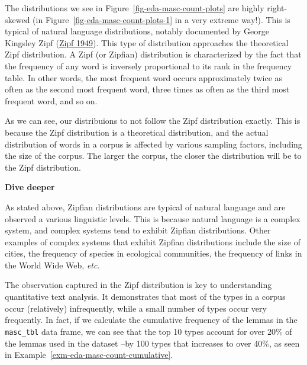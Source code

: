 \documentclass[
  letterpaper,
  DIV=11,
  numbers=noendperiod]{scrreport}
\theoremstyle{definition}
\theoremstyle{remark}
\begin{document}
The distributions we see in Figure~\ref{fig-eda-masc-count-plots} are
highly right-skewed (in Figure~\ref{fig-eda-masc-count-plots-1} in a
very extreme way!). This is typical of natural language distributions,
notably documented by George Kingsley Zipf
(\protect\hyperlink{ref-Zipf1949}{Zipf 1949}). This type of distribution
approaches the theoretical Zipf distribution. A Zipf (or Zipfian)
distribution is characterized by the fact that the frequency of any word
is inversely proportional to its rank in the frequency table. In other
words, the most frequent word occurs approximately twice as often as the
second most frequent word, three times as often as the third most
frequent word, and so on.

As we can see, our distribuions to not follow the Zipf distribution
exactly. This is because the Zipf distribution is a theoretical
distribution, and the actual distribution of words in a corpus is
affected by various sampling factors, including the size of the corpus.
The larger the corpus, the closer the distribution will be to the Zipf
distribution.

\begin{tcolorbox}[enhanced jigsaw, breakable, colback=white, rightrule=.15mm, arc=.35mm, left=2mm, toprule=.15mm, leftrule=.75mm, bottomrule=.15mm, opacityback=0]

\textbf{ Dive deeper}

As stated above, Zipfian distributions are typical of natural language
and are observed a various linguistic levels. This is because natural
language is a complex system, and complex systems tend to exhibit
Zipfian distributions. Other examples of complex systems that exhibit
Zipfian distributions include the size of cities, the frequency of
species in ecological communities, the frequency of links in the World
Wide Web, \emph{etc.}

\end{tcolorbox}

The observation captured in the Zipf distribution is key to
understanding quantitative text analysis. It demonstrates that most of
the types in a corpus occur (relatively) infrequently, while a small
number of types occur very frequently. In fact, if we calculate the
cumulative frequency of the lemmas in the \texttt{masc\_tbl} data frame,
we can see that the top 10 types account for over 20\% of the lemmas
used in the dataset --by 100 types that increases to over 40\%, as seen
in Example~\ref{exm-eda-masc-count-cumulative}.
\end{document}
